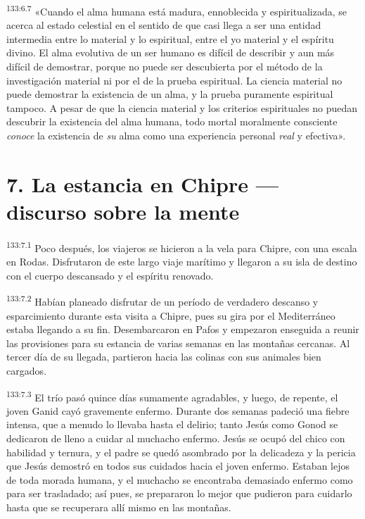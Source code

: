 \par 
\textsuperscript{133:6.7} «Cuando el alma humana está madura, ennoblecida y espiritualizada, se acerca al estado celestial en el sentido de que casi llega a ser una entidad intermedia entre lo material y lo espiritual, entre el yo material y el espíritu divino. El alma evolutiva de un ser humano es difícil de describir y aun más difícil de demostrar, porque no puede ser descubierta por el método de la investigación material ni por el de la prueba espiritual. La ciencia material no puede demostrar la existencia de un alma, y la prueba puramente espiritual tampoco. A pesar de que la ciencia material y los criterios espirituales no puedan descubrir la existencia del alma humana, todo mortal moralmente consciente \textit{conoce} la existencia de \textit{su} alma como una experiencia personal \textit{real} y efectiva».

\section*{7. La estancia en Chipre --- discurso sobre la mente}
\par 
\textsuperscript{133:7.1} Poco después, los viajeros se hicieron a la vela para Chipre, con una escala en Rodas. Disfrutaron de este largo viaje marítimo y llegaron a su isla de destino con el cuerpo descansado y el espíritu renovado.

\par 
\textsuperscript{133:7.2} Habían planeado disfrutar de un período de verdadero descanso y esparcimiento durante esta visita a Chipre, pues su gira por el Mediterráneo estaba llegando a su fin. Desembarcaron en Pafos y empezaron enseguida a reunir las provisiones para su estancia de varias semanas en las montañas cercanas. Al tercer día de su llegada, partieron hacia las colinas con sus animales bien cargados.

\par 
\textsuperscript{133:7.3} El trío pasó quince días sumamente agradables, y luego, de repente, el joven Ganid cayó gravemente enfermo. Durante dos semanas padeció una fiebre intensa, que a menudo lo llevaba hasta el delirio; tanto Jesús como Gonod se dedicaron de lleno a cuidar al muchacho enfermo. Jesús se ocupó del chico con habilidad y ternura, y el padre se quedó asombrado por la delicadeza y la pericia que Jesús demostró en todos sus cuidados hacia el joven enfermo. Estaban lejos de toda morada humana, y el muchacho se encontraba demasiado enfermo como para ser trasladado; así pues, se prepararon lo mejor que pudieron para cuidarlo hasta que se recuperara allí mismo en las montañas.

